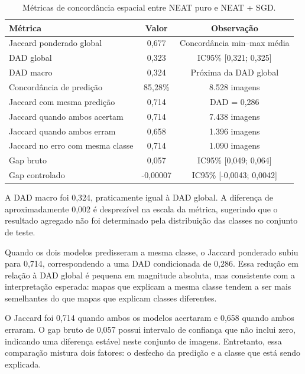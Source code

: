 \begin{table}[ht]
\centering
\caption{M\'etricas de concord\^ancia espacial entre NEAT puro e NEAT + SGD.}
\label{tab:interpretability_results}
\begin{tabular}{lcc}
\toprule
\textbf{M\'etrica} & \textbf{Valor} & \textbf{Observa\c{c}\~ao} \\
\midrule
Jaccard ponderado global & 0,677 & Concord\^ancia min--max m\'edia \\
DAD global & 0,323 & IC95\% [0,321; 0,325] \\
DAD macro & 0,324 & Pr\'oxima da DAD global \\
Concord\^ancia de predi\c{c}\~ao & 85,28\% & 8.528 imagens \\
Jaccard com mesma predi\c{c}\~ao & 0,714 & DAD = 0,286 \\
Jaccard quando ambos acertam & 0,714 & 7.438 imagens \\
Jaccard quando ambos erram & 0,658 & 1.396 imagens \\
Jaccard no erro com mesma classe & 0,714 & 1.090 imagens \\
Gap bruto & 0,057 & IC95\% [0,049; 0,064] \\
Gap controlado & -0,00007 & IC95\% [-0,0043; 0,0042] \\
\bottomrule
\end{tabular}
\end{table}

A DAD macro foi 0,324, praticamente igual \`a DAD global. A diferen\c{c}a de
aproximadamente 0,002 \'{e} desprez\'ivel na escala da m\'etrica, sugerindo que o
resultado agregado n\~ao foi determinado pela distribui\c{c}\~ao das classes no
conjunto de teste.

Quando os dois modelos predisseram a mesma classe, o Jaccard ponderado subiu
para 0,714, correspondendo a uma DAD condicionada de 0,286. Essa redu\c{c}\~ao em
rela\c{c}\~ao \`a DAD global \'{e} pequena em magnitude absoluta, mas consistente com a
interpreta\c{c}\~ao esperada: mapas que explicam a mesma classe tendem a ser mais
semelhantes do que mapas que explicam classes diferentes.

O Jaccard foi 0,714 quando ambos os modelos acertaram e 0,658 quando ambos
erraram. O gap bruto de 0,057 possui intervalo de confian\c{c}a que n\~ao inclui
zero, indicando uma diferen\c{c}a est\'avel neste conjunto de imagens. Entretanto,
essa compara\c{c}\~ao mistura dois fatores: o desfecho da predi\c{c}\~ao e a classe que
est\'a sendo explicada.

